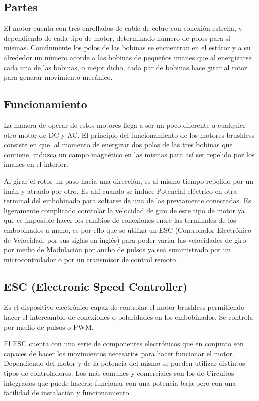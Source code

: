 \documentclass[../main]{subfiles}
\begin{document}
\subsection{Partes}
El motor cuenta con tres enrollados de cable de cobre con conexión estrella, y dependiendo de cada tipo de motor, determinado número de polos para sí mismas. Comúnmente los polos de las bobinas se encuentran en el estátor y a su alrededor un número acorde a las bobinas de pequeños imanes que al energizarse cada una de las bobinas, o mejor dicho, cada par de bobinas hace girar al rotor para generar movimiento mecánico.

\subsection{Funcionamiento}
La manera de operar de estos motores llega a ser un poco diferente a cualquier otro motor de DC y AC. El principio del funcionamiento de los motores brushless consiste en que, al momento de energizar dos polos de las tres bobinas que contiene, induzca un campo magnético en las mismas para así ser repelido por los imanes en el interior.

Al girar el rotor un paso hacia una dirección, es al mismo tiempo repelido por un imán y atraído por otro. Es ahí cuando se induce Potencial eléctrico en otra terminal del embobinado para soltarse de una de las previamente conectadas. Es ligeramente complicado controlar la velocidad de giro de este tipo de motor ya que es imposible hacer los cambios de conexiones entre las terminales de los embobinados a mano, es por ello que se utiliza un ESC (Controlador Electrónico de Velocidad, por sus siglas en inglés) para poder variar las velocidades de giro por medio de Modulación por ancho de pulsos ya sea suministrado por un microcontrolador o por un transmisor de control remoto.

\subsection{ESC (Electronic Speed Controller)}
Es el dispositivo electrónico capaz de controlar el motor brushless permitiendo hacer el intercambio de conexiones o polaridades en los embobinados. Se controla por medio de pulsos o PWM.

El ESC cuenta con una serie de componentes electrónicos que en conjunto son capaces de hacer los movimientos necesarios para hacer funcionar el motor. Dependiendo del motor y de la potencia del mismo se pueden utilizar distintos tipos de controladores. Los más comunes y comerciales son los de Circuitos integrados que puede hacerlo funcionar con una potencia baja pero con una facilidad de instalación y funcionamiento.
\end{document}
